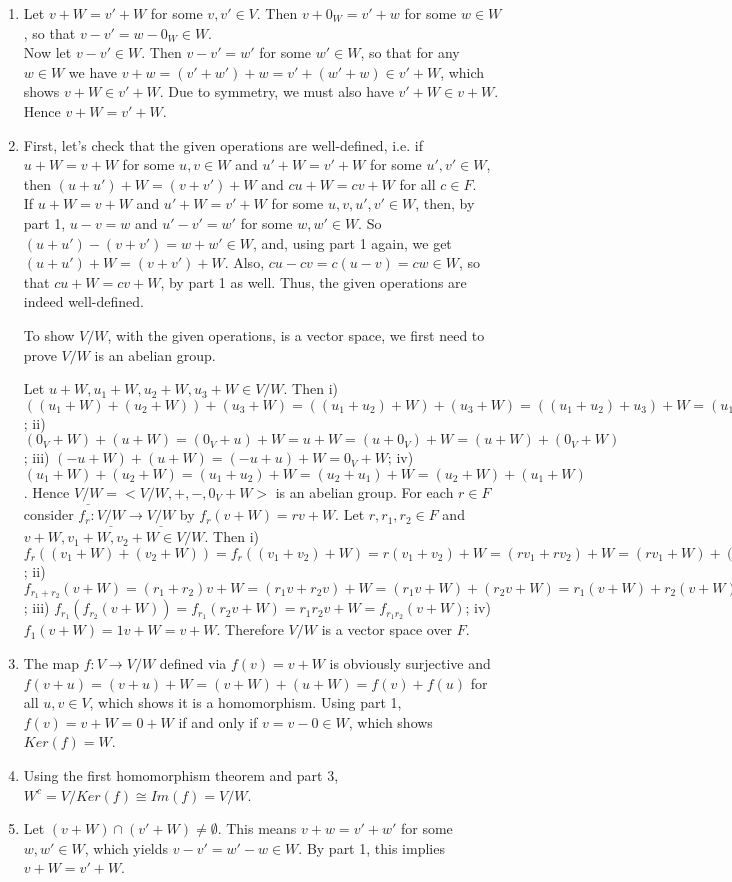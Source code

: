 \begin{solution}

\begin{enumerate}

\item Let $v+W = v'+W$ for some $v, v' \in V$. Then $v+0_W = v'+w$
for some $w \in W$, so that $v-v' = w-0_W \in W$.
\\[2mm]
Now let $v-v' \in W$. Then $v-v' = w'$ for some $w' \in W$, so that for
any $w \in W$ we have $v+w = (v'+w')+w = v'+(w'+w) \in v'+W$, which
shows $v+W \in v'+W$. Due to symmetry, we must also have $v'+W \in v+W$.
Hence $v+W = v'+W$.
\item First, let's check that the given operations are well-defined, i.e. if
$u+W = v+W$ for some $u,v \in W$ and $u'+W = v'+W$ for some $u',v' \in W$,
then $(u+u')+W = (v+v')+W$ and $cu+W = cv+W$ for all $c \in F$.
\\[2mm]
If $u+W = v+W$ and $u'+W = v'+W$ for some $u,v,u',v' \in W$, then, by part 1,
$u-v = w$ and $u'-v' = w'$ for some $w, w' \in W$. So $(u+u')-(v+v') = w+w' \in W$,
and, using part 1 again, we get $(u+u')+W = (v+v')+W$. Also, $cu-cv = c(u-v) = cw \in W$,
so that $cu+W = cv+W$, by part 1 as well. Thus, the given operations are indeed well-defined.

To show $V/W$, with the given operations, is a vector space, we first need to prove $V/W$
is an abelian group.

\vskip2mm

Let $u+W, u_1+W, u_2+W, u_3+W \in V/W$. Then
\smallskip
i) $((u_1+W)+(u_2+W))+(u_3+W) = ((u_1+u_2)+W)+(u_3+W) =
((u_1+u_2)+u_3)+W = (u_1+(u_2+u_3))+W = (u_1+W)+((u_2+u_3)+ W) =
(u_1+W)+((u_2+W)+(u_3+W))$;
\smallskip
ii) $(0_V+W)+(u+W) = (0_V+u)+W = u+W = (u+0_V)+W = (u+W)+(0_V+W)$;
\smallskip
iii) $(-u+W)+(u+W) = (-u+u)+W = 0_V+W$;
\smallskip
iv) $(u_1+W)+(u_2+W) = (u_1+u_2)+W = (u_2+u_1)+W = (u_2+W)+(u_1+W)$.
\smallskip
Hence $\underline{V/W}=<V/W,+,-,0_V+W>$ is an abelian group.
\smallskip
For each $r \in F$ consider $f_r: \underline{V/W} \rightarrow \underline{V/W}$ by $f_r(v+W)=rv+W$. 
\smallskip
Let $r, r_1, r_2 \in F$ and $v+W, v_1+W, v_2+W \in V/W$. Then
\smallskip
i) $f_r((v_1+W)+(v_2+W))=f_r((v_1+v_2)+W)=r(v_1+v_2)+W=(rv_1+rv_2)+W=(rv_1+W)+(rv_2+W)=
r(v_1+W)+r(v_2+W)=f_r(v_1+W)+f_r(v_2+W)$;
\smallskip
ii) $f_{r_1+r_2}(v+W)=(r_1+r_2)v+W=(r_1v+r_2v)+W=(r_1v+W)+(r_2v+W)=r_1(v+W)+r_2(v+W)=
f_{r_1}(v+W)+f_{r_2}(v+W)$;
\smallskip
iii) $f_{r_1}(f_{r_2}(v+W))=f_{r_1}(r_2v+W)=r_1r_2v+W=f_{r_1r_2}(v+W)$;
\smallskip
iv) $f_1(v+W)=1v+W=v+W$.
\smallskip
Therefore $V/W$ is a vector space over $F$.
\item The map $f:V \rightarrow V/W$ defined via $f(v)=v+W$ is obviously surjective and 
$f(v+u)=(v+u)+W=(v+W)+(u+W)=f(v)+f(u)$ for all $u,v \in V$, which shows it is a homomorphism. 
Using part 1, $f(v)=v+W=0+W$ if and only if $v=v-0 \in W$, which shows $Ker(f)=W$.
\item Using the first homomorphism theorem and part 3, $W^c=V/Ker(f) \cong Im(f)=V/W$.
\item Let $(v+W)\cap (v'+W) \neq \emptyset$. This means $v+w=v'+w'$ for some $w,w' \in W$, which yields 
$v-v'=w'-w \in W$. By part 1, this implies $v+W=v'+W$.


\end{enumerate}
\end{solution}
